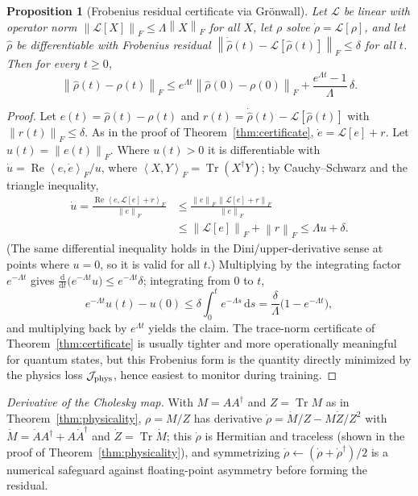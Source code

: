 \documentclass[twocolumn,aps,prxquantum,superscriptaddress,nofootinbib,floatfix,longbibliography]{revtex4-2}
\newtheorem{proposition}[theorem]{Proposition}
\DeclareMathOperator{\Tr}{Tr}
\newcommand{\calJ}{\mathcal{J}}
\newcommand{\calL}{\mathcal{L}}
\newcommand{\dd}{\mathrm{d}}
\newcommand{\norm}[1]{\left\lVert #1 \right\rVert}
\newcommand{\ip}[2]{\left\langle #1,#2 \right\rangle}
\newcommand{\rhohat}{\widehat{\rho}}
\begin{document}
\begin{proposition}[Frobenius residual certificate via Gr\"onwall]
\label{prop:frobenius_certificate}
Let $\calL$ be linear with operator norm $\norm{\calL[X]}_F\le\Lambda\norm{X}_F$ for all $X$, let $\rho$ solve $\dot\rho=\calL[\rho]$, and let $\rhohat$ be differentiable with Frobenius residual $\norm{\dot\rhohat(t)-\calL[\rhohat(t)]}_F\le\delta$ for all $t$. Then for every $t\ge0$,
\[
\norm{\rhohat(t)-\rho(t)}_F\le e^{\Lambda t}\norm{\rhohat(0)-\rho(0)}_F+\frac{e^{\Lambda t}-1}{\Lambda}\,\delta.
\]
\end{proposition}
\begin{proof}
Let $e(t)=\rhohat(t)-\rho(t)$ and $r(t)=\dot\rhohat(t)-\calL[\rhohat(t)]$ with $\norm{r(t)}_F\le\delta$. As in the proof of Theorem~\ref{thm:certificate}, $\dot e=\calL[e]+r$. Let $u(t)=\norm{e(t)}_F$. Where $u(t)>0$ it is differentiable with $\dot u=\operatorname{Re}\ip{e}{\dot e}_F/u$, where $\ip{X}{Y}_F=\Tr(X^\dagger Y)$; by Cauchy--Schwarz and the triangle inequality,
\begin{equation*}
\begin{aligned}
\dot u=\frac{\operatorname{Re}\ip{e}{\calL[e]+r}_F}{\norm{e}_F}&\le\frac{\norm{e}_F\,\norm{\calL[e]+r}_F}{\norm{e}_F}\\
&\le\norm{\calL[e]}_F+\norm{r}_F\le\Lambda u+\delta.
\end{aligned}
\end{equation*}
(The same differential inequality holds in the Dini/upper-derivative sense at points where $u=0$, so it is valid for all $t$.) Multiplying by the integrating factor $e^{-\Lambda t}$ gives $\tfrac{\dd}{\dd t}\big(e^{-\Lambda t}u\big)\le e^{-\Lambda t}\delta$; integrating from $0$ to $t$,
\[
e^{-\Lambda t}u(t)-u(0)\le\delta\int_0^t e^{-\Lambda s}\,\dd s=\frac{\delta}{\Lambda}\big(1-e^{-\Lambda t}\big),
\]
and multiplying back by $e^{\Lambda t}$ yields the claim. The trace-norm certificate of Theorem~\ref{thm:certificate} is usually tighter and more operationally meaningful for quantum states, but this Frobenius form is the quantity directly minimized by the physics loss $\calJ_{\rm phys}$, hence easiest to monitor during training.
\end{proof}

\emph{Derivative of the Cholesky map.} With $M=AA^\dagger$ and $Z=\Tr M$ as in Theorem~\ref{thm:physicality}, $\rho=M/Z$ has derivative $\dot\rho=\dot M/Z-M\dot Z/Z^2$ with $\dot M=\dot A A^\dagger+A\dot A^\dagger$ and $\dot Z=\Tr\dot M$; this $\dot\rho$ is Hermitian and traceless (shown in the proof of Theorem~\ref{thm:physicality}), and symmetrizing $\dot\rho\leftarrow(\dot\rho+\dot\rho^\dagger)/2$ is a numerical safeguard against floating-point asymmetry before forming the residual.
\end{document}
